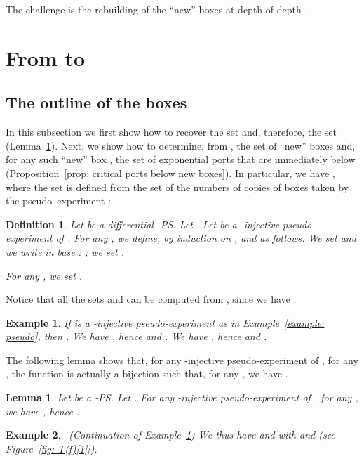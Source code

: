 \documentclass{article}
\theoremstyle{plain}
\newtheorem{definition}{Definition}
\newtheorem{example}{Example}
\newtheorem{lem}[theorem]{Lemma}
\begin{document}
The challenge is the rebuilding of the ``new'' boxes at depth  of depth .

\section{From  to }\label{section: one step}

\subsection{The outline of the boxes}\label{subsection: outline}

In this subsection we first show how to recover the set  and, therefore, the set  (Lemma~\ref{lem: M_i}). Next, we show how to determine, from , the set  of ``new'' boxes and, for any such ``new'' box , the set  of exponential ports that are immediately below (Proposition~\ref{prop: critical ports below new boxes}). In particular, we have , where the set  is defined from the set  of the numbers of copies of boxes taken by the pseudo--experiment :






\begin{definition}\label{defin: the algorithm (b)}
Let  be a differential -PS. Let . Let  be a -injective pseudo-experiment of . For any , we define, by induction on ,  and  as follows. 
We set  and we write  in base : ; we set  .


For any , we set .
\end{definition}

Notice that all the sets  and  can be computed from , since
we have   .

\begin{example}\label{example: N_i(e)}
If  is a -injective pseudo-experiment as in Example~\ref{example: pseudo}, then . We have , hence  and . We have , hence  and .  
\end{example}


The following lemma shows that, for any -injective pseudo-experiment  of , for any , the function  is actually a bijection  such that, for any ,  we have  . 

\begin{lem}\label{lem: M_i}
Let  be a -PS. 
Let . 
For any -injective pseudo-experiment  of , for any , we have , hence .
\end{lem}

\begin{example}~\label{example: N_i(e) - 2}
(Continuation of Example~\ref{example: N_i(e)}) We thus have  and  with    and    (see Figure~\ref{fig: T(f)[1]}).
\end{example}
\end{document}
